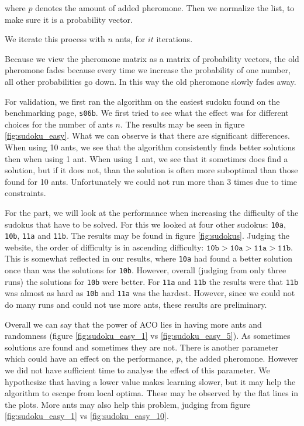 \documentclass[11pt]{article}
\begin{document}
where $p$ denotes the amount of added pheromone. Then we normalize the list, to make sure it is a probability vector.

We iterate this process with $n$ ants, for $it$ iterations.

Because we view the pheromone matrix as a matrix of probability vectors, the old pheromone fades because every time we increase the probability of one number, all other probabilities go down. In this way the old pheromone slowly fades away.

For validation, we first ran the algorithm on the easiest sudoku found on the benchmarking page, \texttt{s06b}. We first tried to see what the effect was for different choices for the number of ants $n$. The results may be seen in figure \ref{fig:sudoku_easy}. What we can observe is that there are significant differences. When using 10 ants, we see that the algorithm consistently finds better solutions then when using 1 ant. When using 1 ant, we see that it sometimes does find a solution, but if it does not, than the solution is often more suboptimal than those found for 10 ants. Unfortunately we could not run more than 3 times due to time constraints.

For the part, we will look at the performance when increasing the difficulty of the sudokus that have to be solved. For this we looked at four other sudokus: \texttt{10a}, \texttt{10b}, \texttt{11a} and \texttt{11b}. The results may be found in figure \ref{fig:sudokus}. Judging the website, the order of difficulty is in ascending difficulty: $\texttt{10b} > \texttt{10a} > \texttt{11a} > \texttt{11b}$. This is somewhat reflected in our results, where \texttt{10a} had found a better solution once than was the solutions for \texttt{10b}. However, overall (judging from only three runs) the solutions for \texttt{10b} were better. For \texttt{11a} and \texttt{11b} the results were that \texttt{11b} was almost as hard as \texttt{10b} and \texttt{11a} was the hardest. However, since we could not do many runs and could not use more ants, these results are preliminary.

Overall we can say that the power of ACO lies in having more ants and randomness (figure \ref{fig:sudoku_easy_1} vs \ref{fig:sudoku_easy_5}). As sometimes solutions are found and sometimes they are not. There is another parameter which could have an effect on the performance, $p$, the added pheromone. However we did not have sufficient time to analyse the effect of this parameter. We hypothesize that having a lower value makes learning slower, but it may help the algorithm to escape from local optima. These may be observed by the flat lines in the plots. More ants may also help this problem, judging from figure \ref{fig:sudoku_easy_1} vs \ref{fig:sudoku_easy_10}.
\end{document}
